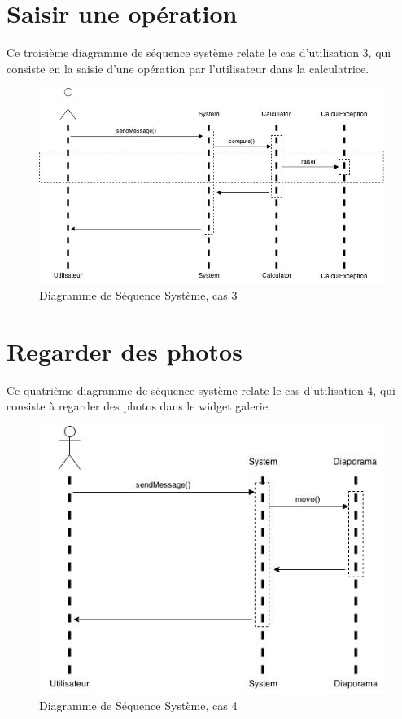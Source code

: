 \section{Saisir une opération}

Ce troisième diagramme de séquence système relate le cas d'utilisation
3, qui consiste en la saisie d'une opération par l'utilisateur dans la 
calculatrice.

\begin{figure}[h!]
	\centering
	\includegraphics[scale=0.4]{diagrammes/DSS3.jpg}
	\caption{Diagramme de Séquence Système, cas 3}
\end{figure}

\section{Regarder des photos}

Ce quatrième diagramme de séquence système relate le cas d'utilisation
4, qui consiste à regarder des photos dans le widget galerie.

\begin{figure}[h!]
	\centering
	\includegraphics[scale=0.4]{diagrammes/DSS4.jpg}
	\caption{Diagramme de Séquence Système, cas 4}
\end{figure}

